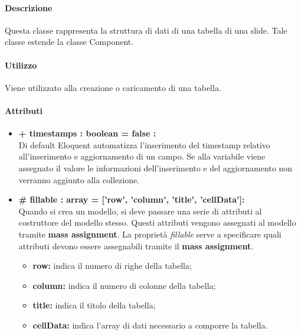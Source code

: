 	\paragraph{Descrizione}
	Questa classe rappresenta la struttura di dati di una tabella di una slide. Tale classe estende la classe Component.
	
	\paragraph{Utilizzo}
	Viene utilizzato alla creazione o caricamento di una tabella.
	
	\paragraph{Attributi}
	\begin{itemize}
		\item \textbf{+ timestamps : boolean = false :}\\
		Di default Eloquent automatizza l'inserimento del timestamp relativo all'inserimento e aggiornamento di un campo. Se alla variabile viene assegnato il valore le informazioni dell'inserimento e del aggiornamento non verranno aggiunto alla collezione.
		\item \textbf{\# fillable : array = [’row’, ’column’, ’title’, ’cellData’]:}\\
		Quando si crea un modello, si deve passare una serie di attributi al costruttore del modello stesso. Questi attributi vengono assegnati al modello tramite \textbf{mass assignment}. La proprietà \textit{fillable} serve a specificare quali attributi devono essere assegnabili tramite il \textbf{mass assignment}.
		\begin{itemize}
			\item \textbf{row:} indica il numero di righe della tabella;
			\item \textbf{column:} indica il numero di colonne della tabella;
			\item \textbf{title:} indica il titolo della tabella;
			\item \textbf{cellData:} indica l'array di dati necessario a comporre la tabella.
		\end{itemize}
	\end{itemize}